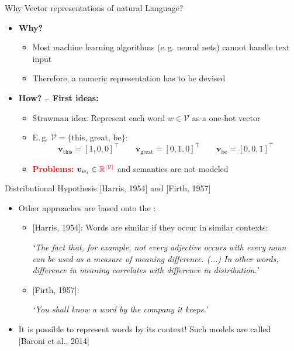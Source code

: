 \begin{frame}{Why Vector representations of natural Language?}{}
	\begin{itemize}
		\item \textbf{Why?}
		\begin{itemize}
			\item Most machine learning algorithms (e.\,g. neural nets) cannot handle text input
			\item Therefore, a numeric representation has to be devised
		\end{itemize}
		\item{\textbf{How? -- First ideas:}}
		\begin{itemize}
			\item Strawman idea: Represent each word $w \in \mathcal{V}$ as a one-hot vector
			\item E.\,g. $\mathcal{V} = \{$this, great, be$\}$:
			\begin{equation*}	
				\bm{v}_{\text{this}} = [1,0,0]^{\intercal} \qquad
				\bm{v}_{\text{great}} = [0,1,0]^{\intercal} \qquad
				\bm{v}_{\text{be}} = [0,0,1]^{\intercal}
			\end{equation*}
			\item \textcolor{red}{\textbf{Problems:}} $\bm{v}_{w_i} \in \textcolor{red}{\mathbb{R}^{\vert \mathcal{V} \vert}}$
			 	and semantics are not modeled
		\end{itemize}
	\end{itemize}
\end{frame}


\begin{frame}{Distributional Hypothesis [Harris, 1954] and [Firth, 1957]}{}
	\begin{itemize}
		\item Other approaches are based onto the :
		\begin{itemize}
			\item{} [Harris, 1954]: Words are similar if they occur in similar contexts:
			\vspace*{2mm}
			\begin{center}
				\textit{`The fact that, for example, not every adjective occurs with every noun can be used as a measure
				of meaning  difference. (...) In other words, difference in meaning correlates with difference in distribution.'}
			\end{center}
			\vspace*{2mm}
			\item{} [Firth, 1957]:
			\vspace*{2mm}
			\begin{center}
				\textit{`You shall know a word by the company it keeps.'}
			\end{center}
			\vspace*{2mm}
		\end{itemize}
		\item It is possible to represent words by its context! Such models are called 
			[Baroni et al., 2014]
	\end{itemize}
\end{frame}


